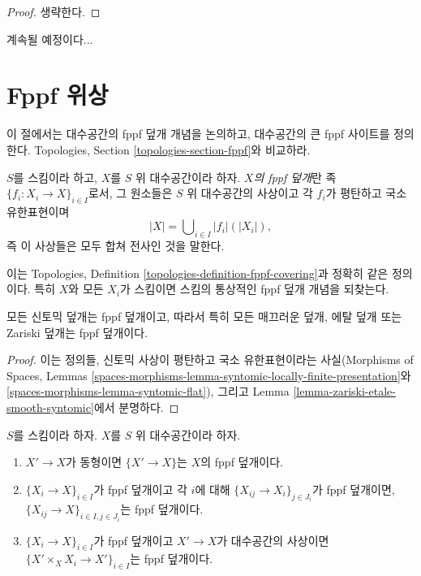 \begin{proof}
생략한다.
\end{proof}

\noindent
계속될 예정이다...
\section{Fppf 위상}
\label{section-fppf}

\noindent
이 절에서는 대수공간의 fppf 덮개 개념을 논의하고, 대수공간의 큰 fppf
사이트를 정의한다. Topologies, Section \ref{topologies-section-fppf}와
비교하라.

\begin{definition}
\label{definition-fppf-covering}
$S$를 스킴이라 하고, $X$를 $S$ 위 대수공간이라 하자. {\it $X$의 fppf
덮개}란 족 $\{f_i : X_i \to X\}_{i \in I}$로서, 그 원소들은 $S$ 위
대수공간의 사상이고 각 $f_i$가 평탄하고 국소 유한표현이며
$$
|X| = \bigcup\nolimits_{i \in I} |f_i|(|X_i|),
$$
즉 이 사상들은 모두 합쳐 전사인 것을 말한다.
\end{definition}

\noindent
이는 Topologies, Definition \ref{topologies-definition-fppf-covering}과
정확히 같은 정의이다. 특히 $X$와 모든 $X_i$가 스킴이면 스킴의 통상적인
fppf 덮개 개념을 되찾는다.

\begin{lemma}
\label{lemma-zariski-etale-smooth-syntomic-fppf}
모든 신토믹 덮개는 fppf 덮개이고, 따라서 특히 모든 매끄러운 덮개, 에탈
덮개 또는 Zariski 덮개는 fppf 덮개이다.
\end{lemma}

\begin{proof}
이는 정의들, 신토믹 사상이 평탄하고 국소 유한표현이라는 사실(Morphisms
of Spaces, Lemmas
\ref{spaces-morphisms-lemma-syntomic-locally-finite-presentation}와
\ref{spaces-morphisms-lemma-syntomic-flat}), 그리고 Lemma
\ref{lemma-zariski-etale-smooth-syntomic}에서 분명하다.
\end{proof}

\begin{lemma}
\label{lemma-fppf}
$S$를 스킴이라 하자. $X$를 $S$ 위 대수공간이라 하자.
\begin{enumerate}
\item $X' \to X$가 동형이면 $\{X' \to X\}$는 $X$의 fppf 덮개이다.
\item $\{X_i \to X\}_{i\in I}$가 fppf 덮개이고 각 $i$에 대해
$\{X_{ij} \to X_i\}_{j\in J_i}$가 fppf 덮개이면,
$\{X_{ij} \to X\}_{i \in I, j\in J_i}$는 fppf 덮개이다.
\item $\{X_i \to X\}_{i\in I}$가 fppf 덮개이고 $X' \to X$가
대수공간의 사상이면
$\{X' \times_X X_i \to X'\}_{i\in I}$는 fppf 덮개이다.
\end{enumerate}
\end{lemma}

